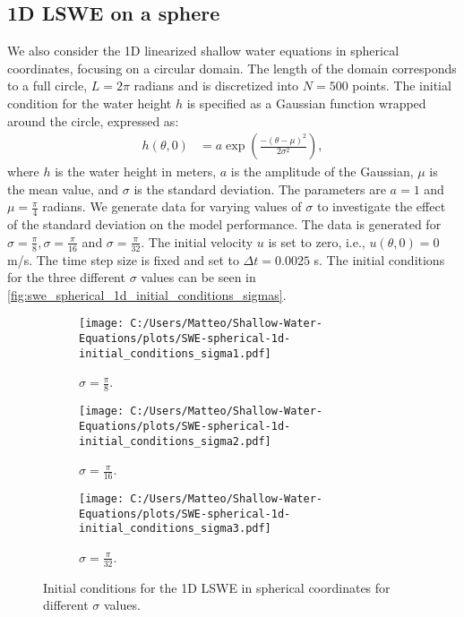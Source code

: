 \subsection*{1D LSWE on a sphere}
We also consider the 1D linearized shallow water equations in spherical coordinates, focusing on a circular domain.
The length of the domain corresponds to a full circle, $L = 2 \pi$ radians and is discretized into $N = 500$ points.
The initial condition for the water height $h$ is specified as a Gaussian function wrapped around the circle, expressed as:
\begin{align}\label{eq:1D_swe_spherical_ic}
    h(\theta, 0) &= a \exp \left( \frac{-{(\theta-\mu)}^2}{2 \sigma^2} \right),
\end{align}
where $h$ is the water height in meters, $a$ is the amplitude of the Gaussian, $\mu$ is the mean value, and $\sigma$ is the standard deviation.
The parameters are $a = 1$  and $\mu = \frac{\pi}{4}$ radians.
We generate data for varying values of $\sigma$ to investigate the effect of the standard deviation on the model performance.
The data is generated for $\sigma = \frac{\pi}{8}, \sigma = \frac{\pi}{16}$ and $\sigma = \frac{\pi}{32}$.
The initial velocity $u$ is set to zero, i.e., $u(\theta,0) = 0$ m/s.
The time step size is fixed and set to $\Delta t = 0.0025$ s.
The initial conditions for the three different $\sigma$ values can be seen in \autoref{fig:swe_spherical_1d_initial_conditions_sigmas}.
\begin{figure}[H]
    \centering
    \begin{subfigure}[b]{0.32\textwidth}
        \centering
        \texttt{[image: C:/Users/Matteo/Shallow-Water-Equations/plots/SWE-spherical-1d-initial\_conditions\_sigma1.pdf]}
        \caption{$\sigma = \frac{\pi}{8}$.}\label{fig:swe_spherical_1d_sigma1}
    \end{subfigure}
    \begin{subfigure}[b]{0.32\textwidth}
        \centering
        \texttt{[image: C:/Users/Matteo/Shallow-Water-Equations/plots/SWE-spherical-1d-initial\_conditions\_sigma2.pdf]}
        \caption{$\sigma = \frac{\pi}{16}$.}\label{fig:swe_spherical_1d_sigma2}
    \end{subfigure}
    \begin{subfigure}[b]{0.32\textwidth}
        \centering
        \texttt{[image: C:/Users/Matteo/Shallow-Water-Equations/plots/SWE-spherical-1d-initial\_conditions\_sigma3.pdf]}
        \caption{$\sigma = \frac{\pi}{32}$.}\label{fig:swe_spherical_1d_sigma3}
    \end{subfigure}
    \caption{Initial conditions for the 1D LSWE in spherical coordinates for different \(\sigma\) values.}\label{fig:swe_spherical_1d_initial_conditions_sigmas}
\end{figure}
